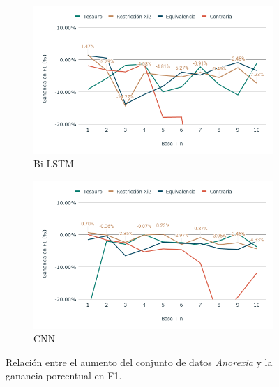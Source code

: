 \begin{figure}[hbt!]
    \begin{subfigure}[b]{0.5\textwidth}
        \includegraphics[width=\textwidth]{sections/figures/bi_LSTMAnox.png}
        \caption{Bi-LSTM}
    \end{subfigure}
    \hfill
    \begin{subfigure}[b]{0.5\textwidth}
        \includegraphics[width=\textwidth]{sections/figures/CNNAnox.png}
        \caption{CNN}
    \end{subfigure}
    \hfill
    
    
    \caption{Relación entre el aumento del conjunto de datos \textit{Anorexia} y la ganancia porcentual en F1.}
    \label{fig:aumento_n_anorexia}
\end{figure}